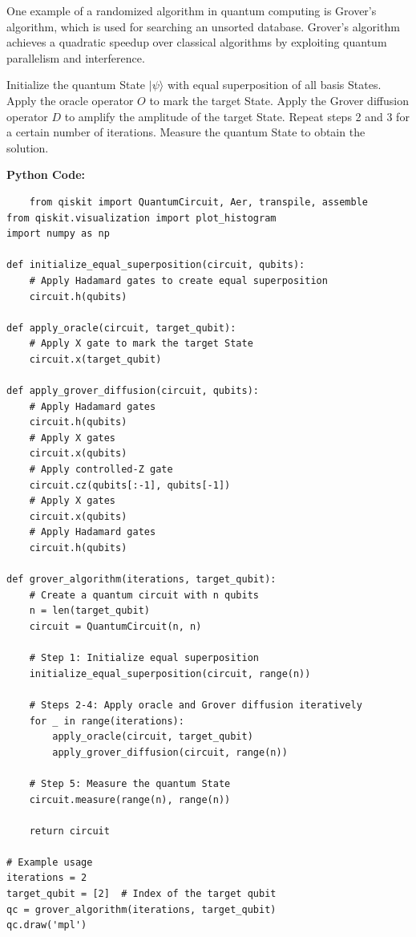 \documentclass[12pt]{book} %
\begin{document}
One example of a randomized algorithm in quantum computing is Grover's algorithm, which is used for searching an unsorted database. Grover's algorithm achieves a quadratic speedup over classical algorithms by exploiting quantum parallelism and interference.
\FloatBarrier
\begin{algorithm}
\caption{Grover's Algorithm}
\begin{algorithmic}
\State Initialize the quantum State \(|\psi\rangle\) with equal superposition of all basis States.
\State Apply the oracle operator \(O\) to mark the target State.
\State Apply the Grover diffusion operator \(D\) to amplify the amplitude of the target State.
\State Repeat steps 2 and 3 for a certain number of iterations.
\State Measure the quantum State to obtain the solution.
\end{algorithmic}
\end{algorithm}
\FloatBarrier
\textbf{Python Code:}
\FloatBarrier
\begin{lstlisting}
    from qiskit import QuantumCircuit, Aer, transpile, assemble
from qiskit.visualization import plot_histogram
import numpy as np

def initialize_equal_superposition(circuit, qubits):
    # Apply Hadamard gates to create equal superposition
    circuit.h(qubits)

def apply_oracle(circuit, target_qubit):
    # Apply X gate to mark the target State
    circuit.x(target_qubit)

def apply_grover_diffusion(circuit, qubits):
    # Apply Hadamard gates
    circuit.h(qubits)
    # Apply X gates
    circuit.x(qubits)
    # Apply controlled-Z gate
    circuit.cz(qubits[:-1], qubits[-1])
    # Apply X gates
    circuit.x(qubits)
    # Apply Hadamard gates
    circuit.h(qubits)

def grover_algorithm(iterations, target_qubit):
    # Create a quantum circuit with n qubits
    n = len(target_qubit)
    circuit = QuantumCircuit(n, n)

    # Step 1: Initialize equal superposition
    initialize_equal_superposition(circuit, range(n))

    # Steps 2-4: Apply oracle and Grover diffusion iteratively
    for _ in range(iterations):
        apply_oracle(circuit, target_qubit)
        apply_grover_diffusion(circuit, range(n))

    # Step 5: Measure the quantum State
    circuit.measure(range(n), range(n))
    
    return circuit

# Example usage
iterations = 2
target_qubit = [2]  # Index of the target qubit
qc = grover_algorithm(iterations, target_qubit)
qc.draw('mpl')
\end{lstlisting}
\end{document}
